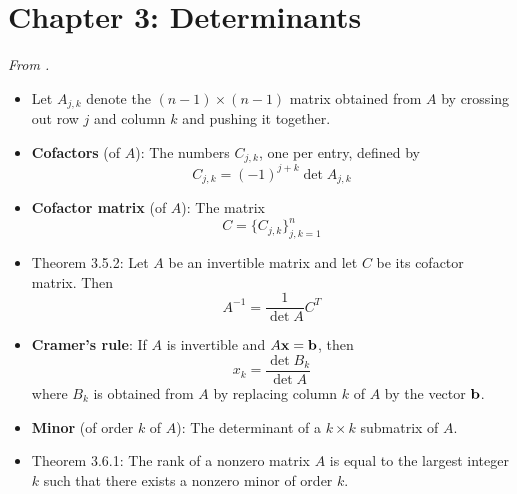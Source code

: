 \documentclass[../../notes.tex]{subfiles}
\begin{document}
\section{Chapter 3: Determinants}
\emph{From \textcite{bib:Treil}.}
\begin{itemize}
    \item {}Let $A_{j,k}$ denote the $(n-1)\times(n-1)$ matrix obtained from $A$ by crossing out row $j$ and column $k$ and pushing it together.
    \item \textbf{Cofactors} (of $A$): The numbers $C_{j,k}$, one per entry, defined by
    \begin{equation*}
        C_{j,k} = (-1)^{j+k}\det A_{j,k}
    \end{equation*}
    \item \textbf{Cofactor matrix} (of $A$): The matrix
    \begin{equation*}
        C = \{C_{j,k}\}_{j,k=1}^n
    \end{equation*}
    \item Theorem 3.5.2: Let $A$ be an invertible matrix and let $C$ be its cofactor matrix. Then
    \begin{equation*}
        A^{-1} = \frac{1}{\det A}C^T
    \end{equation*}
    \item \textbf{Cramer's rule}: If $A$ is invertible and $A\mathbf{x}=\mathbf{b}$, then
    \begin{equation*}
        x_k = \frac{\det B_k}{\det A}
    \end{equation*}
    where $B_k$ is obtained from $A$ by replacing column $k$ of $A$ by the vector $\mathbf{b}$.
    \item \textbf{Minor} (of order $k$ of $A$): The determinant of a $k\times k$ submatrix of $A$.
    \item Theorem 3.6.1: The rank of a nonzero matrix $A$ is equal to the largest integer $k$ such that there exists a nonzero minor of order $k$.
\end{itemize}
\end{document}
